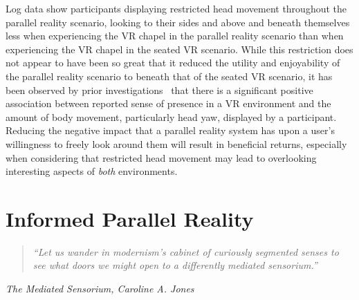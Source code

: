 Log data show participants displaying restricted head movement throughout the parallel reality scenario, looking to their sides and above and beneath themselves less when experiencing the VR chapel in the parallel reality scenario than when experiencing the VR chapel in the seated VR scenario. While this restriction does not appear to have been so great that it reduced the utility and enjoyability of the parallel reality scenario to beneath that of the seated VR scenario, it has been observed by prior investigations~\cite{Slater1998} that there is a significant positive association between reported sense of presence in a VR environment and the amount of body movement, particularly head yaw, displayed by a participant. Reducing the negative impact that a parallel reality system has upon a user's willingness to freely look around them will result in beneficial returns, especially when considering that restricted head movement may lead to overlooking interesting aspects of \textit{both} environments.



\chapter{Informed Parallel Reality}


\begin{quote}
	\textit{``Let us wander in modernism's cabinet of curiously segmented senses to see what doors we might open to a differently mediated sensorium.''}
\end{quote}
\hfill \textit{The Mediated Sensorium, Caroline A. Jones}
\\
\\

